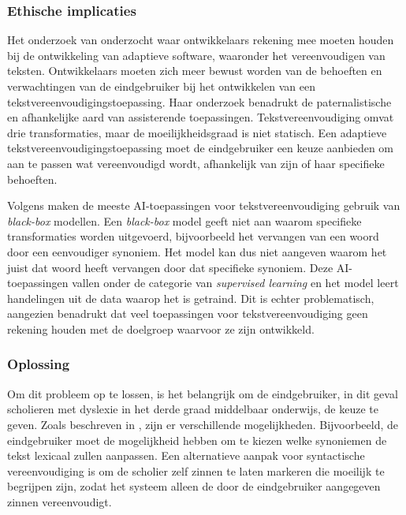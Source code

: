 \subsubsection{Ethische implicaties}

Het onderzoek van \textcite{Gooding2022} onderzocht waar ontwikkelaars rekening mee moeten houden bij de ontwikkeling van adaptieve software, waaronder het vereenvoudigen van teksten. Ontwikkelaars moeten zich meer bewust worden van de behoeften en verwachtingen van de eindgebruiker bij het ontwikkelen van een tekstvereenvoudigingstoepassing. Haar onderzoek benadrukt de paternalistische en afhankelijke aard van assisterende toepassingen. Tekstvereenvoudiging omvat drie transformaties, maar de moeilijkheidsgraad is niet statisch. Een adaptieve tekstvereenvoudigingstoepassing moet de eindgebruiker een keuze aanbieden om aan te passen wat vereenvoudigd wordt, afhankelijk van zijn of haar specifieke behoeften.


Volgens \textcite{Punardeep2020} maken de meeste AI-toepassingen voor tekstvereenvoudiging gebruik van \textit{black-box} modellen. Een \textit{black-box} model geeft niet aan waarom specifieke transformaties worden uitgevoerd, bijvoorbeeld het vervangen van een woord door een eenvoudiger synoniem. Het model kan dus niet aangeven waarom het juist dat woord heeft vervangen door dat specifieke synoniem. Deze AI-toepassingen vallen onder de categorie van \textit{supervised learning} en het model leert handelingen uit de data waarop het is getraind. Dit is echter problematisch, aangezien \textcite{Xu2015} benadrukt dat veel toepassingen voor tekstvereenvoudiging geen rekening houden met de doelgroep waarvoor ze zijn ontwikkeld. 


\subsubsection{Oplossing}

Om dit probleem op te lossen, is het belangrijk om de eindgebruiker, in dit geval scholieren met dyslexie in het derde graad middelbaar onderwijs, de keuze te geven. Zoals beschreven in \textcite{Gooding2022}, zijn er verschillende mogelijkheden. Bijvoorbeeld, de eindgebruiker moet de mogelijkheid hebben om te kiezen welke synoniemen de tekst lexicaal zullen aanpassen. Een alternatieve aanpak voor syntactische vereenvoudiging is om de scholier zelf zinnen te laten markeren die moeilijk te begrijpen zijn, zodat het systeem alleen de door de eindgebruiker aangegeven zinnen vereenvoudigt.


